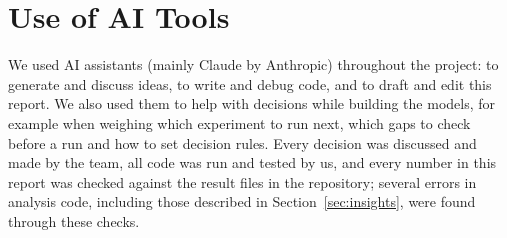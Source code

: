 \documentclass[11pt,a4paper]{article}
\begin{document}
\section*{Use of AI Tools}

We used AI assistants (mainly Claude by Anthropic) throughout the project: to generate and discuss ideas, to write and debug code, and to draft and edit this report. We also used them to help with decisions while building the models, for example when weighing which experiment to run next, which gaps to check before a run and how to set decision rules. Every decision was discussed and made by the team, all code was run and tested by us, and every number in this report was checked against the result files in the repository; several errors in analysis code, including those described in Section~\ref{sec:insights}, were found through these checks.
\end{document}
